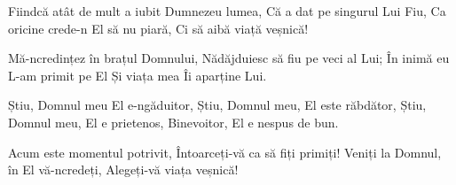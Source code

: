 \beginchorus
Fiindcă atât de mult a iubit Dumnezeu lumea,
Că a dat pe singurul Lui Fiu,
Ca oricine crede-n El să nu piară,
Ci să aibă viață veșnică!
\endchorus

\beginverse
Mă-ncredințez în brațul Domnului,
Nădăjduiesc să fiu pe veci al Lui;
În inimă eu L-am primit pe El
Și viața mea Îi aparține Lui.
\endverse

\beginverse
Știu, Domnul meu El e-ngăduitor,
Știu, Domnul meu, El este răbdător,
Știu, Domnul meu, El e prietenos,
Binevoitor, El e nespus de bun.
\endverse

\beginverse
Acum este momentul potrivit,
Întoarceți-vă ca să fiți primiți!
Veniți la Domnul, în El vă-ncredeți,
Alegeți-vă viața veșnică!
\endverse
\endsong